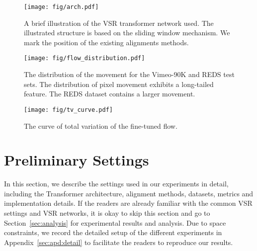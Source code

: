 \documentclass{article}
\begin{document}
\begin{figure}[t]
    \centering
    \texttt{[image: fig/arch.pdf]}
    \vspace{-5mm}
\caption{A brief illustration of the VSR transformer network used. The illustrated structure is based on the sliding window mechanism. We mark the position of the existing alignments methods.}
    \label{fig:VSRT}
    \vspace{-3mm}
\end{figure}

 
\begin{figure}[t]
\begin{minipage}[t]{0.78\textwidth}
\centering
    \texttt{[image: fig/flow\_distribution.pdf]}
    \vspace{-5mm}
    \caption{The distribution of the movement for the Vimeo-90K \cite{xue2019video} and REDS \cite{nah2019ntire} test sets. The distribution of pixel movement exhibits a long-tailed feature. The REDS dataset contains a larger movement.}
    \label{fig:flow_distribution}
\end{minipage}
\hfill
\begin{minipage}[t]{0.2\textwidth}
    \centering
    \texttt{[image: fig/tv\_curve.pdf]}
    \vspace{-5mm}
    \caption{The curve of total variation of the fine-tuned flow.}
    \label{fig:flow_tv}
\end{minipage}
\vspace{-6mm}
\end{figure}


\vspace{-3mm}
\section{Preliminary Settings}
\label{sec:preliminary_settings}
\vspace{-2mm}
In this section, we describe the settings used in our experiments in detail, including the Transformer architecture, alignment methods, datasets, metrics and implementation details.
If the readers are already familiar with the common VSR settings and VSR networks, it is okay to skip this section and go to Section~\ref{sec:analysis} for experimental results and analysis. 
Due to space constraints, we record the detailed setup of the different experiments in Appendix~\ref{sec:apd:detail} to facilitate the readers to reproduce our results.


\vspace{-3mm}
\end{document}
